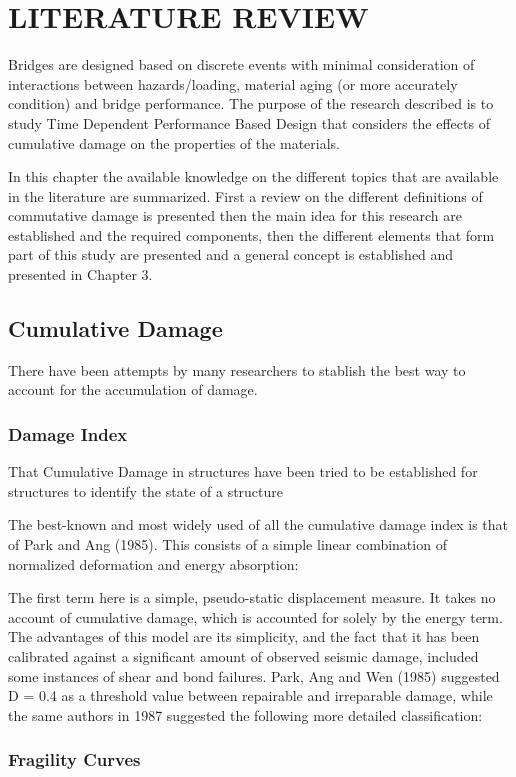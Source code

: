 \chapter{LITERATURE REVIEW}
\label{chap-two}
Bridges are designed based on discrete events with minimal consideration of interactions between hazards/loading, material aging (or more accurately condition) and bridge performance. The purpose of the research described is to study Time Dependent Performance Based Design that considers the effects of cumulative damage on the properties of the materials.

In this chapter the available knowledge on the different topics that are available in the literature are summarized. First a review on the different definitions of commutative damage is presented then the main idea for this research are established and the required components, then the different elements that form part of this study are presented and  a general concept is established and presented in Chapter 3.

\section{Cumulative Damage}

There have been attempts by many researchers to stablish the best way to account for the accumulation of damage. 

\subsection{Damage Index}
That Cumulative Damage in structures have been tried to be established for structures to identify the state of a structure 

The best-known and most widely used of all the cumulative damage index is that of Park and Ang (1985). This consists of a simple linear combination of normalized deformation and energy absorption: 

The first term here is a simple, pseudo-static displacement measure. It takes no account of cumulative damage, which is accounted for solely by the energy term. The advantages of this model are its simplicity, and the fact that it has been calibrated against a significant amount of observed seismic damage, included some instances of shear and bond failures. Park, Ang and Wen (1985) suggested D = 0.4 as a threshold value between repairable and irreparable damage, while the same authors in 1987 suggested the following more detailed classification:

\subsection{Fragility Curves}
